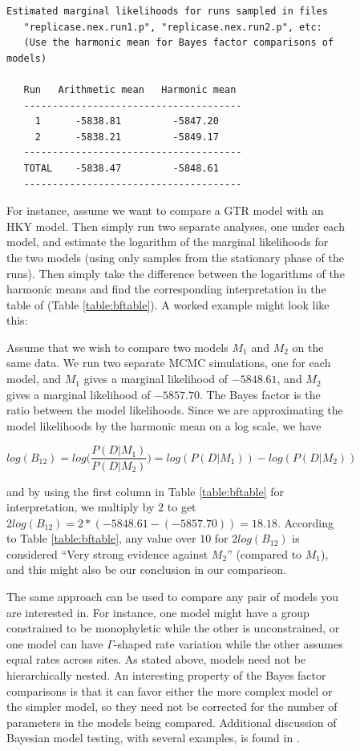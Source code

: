 \documentclass[12pt]{book}
\begin{document}
\begin{figure}[h]
\begin{singlespacing}
\footnotesize
\begin{verbatim}
Estimated marginal likelihoods for runs sampled in files
   "replicase.nex.run1.p", "replicase.nex.run2.p", etc:
   (Use the harmonic mean for Bayes factor comparisons of models)

   Run   Arithmetic mean   Harmonic mean
   --------------------------------------
     1      -5838.81         -5847.20
     2      -5838.21         -5849.17
   --------------------------------------
   TOTAL    -5838.47         -5848.61
   --------------------------------------
\end{verbatim}
\normalsize
\end{singlespacing}

For instance, assume we want to compare a GTR model with an HKY model. Then simply run two separate
analyses, one under each model, and estimate the logarithm of the marginal likelihoods for the two
models (using only samples from the stationary phase of the runs). Then simply take the difference
between the logarithms of the harmonic means and find the corresponding interpretation in the table
of \citet{kass95} (Table \ref{table:bftable}). A worked example might look like this:

Assume that we wish to compare two models $M_{1}$ and $M_{2}$ on the same data. We run two separate
MCMC simulations, one for each model, and $M_{1}$ gives a marginal likelihood of $-5848.61$, and
$M_{2}$ gives a marginal likelihood of $-5857.70$.  The Bayes factor is the ratio between the model
likelihoods. Since we are approximating the model likelihoods by the harmonic mean on a log scale,
we have 

$$
log (B_{12}) =
log \Big(\frac{P(D|M_{1})}{P(D|M_{2})}\Big) = log(P(D|M_{1})) - log(P(D|M_{2}))
$$

and by using the first column in Table \ref{table:bftable} for interpretation, we multiply by $2$
to get $2 log(B_{12}) = 2 * (-5848.61 - (-5857.70)) = 18.18$. According to Table
\ref{table:bftable}, any value over $10$ for $2 log(B_{12})$ is considered ``Very strong evidence
against $M_{2}$'' (compared to $M_{1}$), and this might also be our conclusion in our comparison.

The same approach can be used to compare any pair of models you are interested in. For instance,
one model might have a group constrained to be monophyletic while the other is unconstrained, or
one model can have $\Gamma$-shaped rate variation while the other assumes equal rates across sites.
As stated above, models need not be hierarchically nested.  An interesting property of the Bayes
factor comparisons is that it can favor either the more complex model or the simpler model, so they
need not be corrected for the number of parameters in the models being compared. Additional
discussion of Bayesian model testing, with several examples, is found in \citet{nylander04}.



\end{figure}
\end{document}
